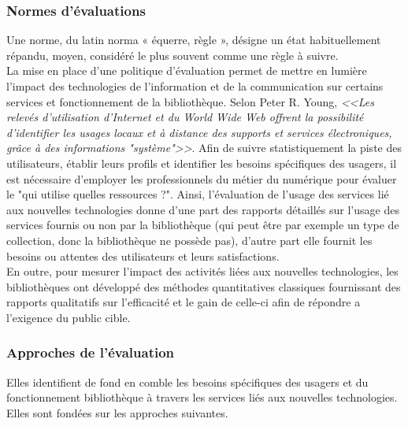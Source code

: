 \documentclass[french,a4paper,12pt]{article}
\begin{document}
\subsubsection{Normes d'évaluations\citep{young1998evaluation} }

\quad Une norme, du latin norma « équerre, règle », désigne un état habituellement répandu, moyen, considéré le plus souvent comme une règle à suivre. \\
\quad La mise en place d’une politique d’évaluation permet de mettre en lumière l’impact des technologies de l’information et de la communication sur certains services et fonctionnement de la bibliothèque. 
Selon Peter R. Young, \textit{<<Les relevés d'utilisation d'Internet et du World Wide Web offrent la possibilité d'identifier les usages locaux et à distance des supports et services électroniques, grâce à des informations "système">>\citep{young1998evaluation}}. Afin de suivre statistiquement la piste des utilisateurs, établir leurs profils et identifier les besoins spécifiques des usagers, il est nécessaire d’employer les professionnels du métier du numérique pour évaluer le "qui utilise quelles ressources ?". Ainsi, l’évaluation de l’usage des services lié aux nouvelles technologies donne d’une part des rapports détaillés sur l’usage des services fournis ou non par la bibliothèque (qui peut être par exemple un type de collection, donc la bibliothèque ne possède pas), d’autre part elle fournit les besoins ou attentes des utilisateurs et leurs satisfactions. \\
\quad En outre, pour mesurer l’impact des activités liées aux nouvelles technologies, les bibliothèques ont développé des méthodes quantitatives classiques fournissant des rapports qualitatifs sur l’efficacité et le gain de celle-ci afin de répondre a l’exigence du public cible.\\





\subsubsection{Approches de l'évaluation}
\quad Elles identifient de fond en comble les besoins spécifiques des usagers et du fonctionnement bibliothèque à travers les services liés aux nouvelles technologies. Elles sont fondées sur les approches suivantes. 
\end{document}
